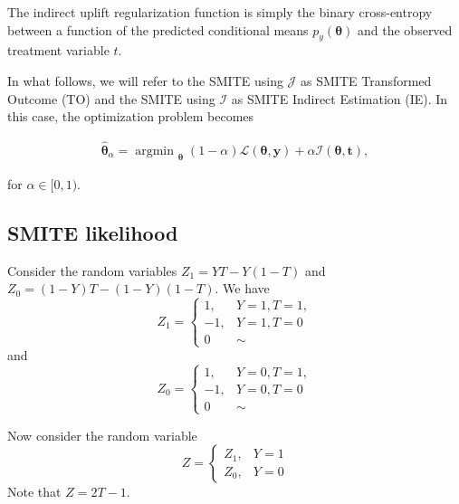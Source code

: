 \documentclass{article}
\def\tt{\mathbf t}
\def\y{\mathbf y}
\DeclareMathOperator*{\argmin}{argmin~} %
\begin{document}
The indirect uplift regularization function is simply the binary cross-entropy between a function of the predicted conditional means $p_y(\boldsymbol{\theta})$ and the observed treatment variable $t$. 


In what follows, we will refer to the SMITE using $\mathcal{J}$ as SMITE Transformed Outcome (TO) and the SMITE using  $\mathcal{I}$ as SMITE Indirect Estimation (IE). In this case, the optimization problem becomes

\begin{align*}
    {\boldsymbol{\hat\theta}}_{\alpha} = \argmin_{\boldsymbol{\theta}} (1 - \alpha)  \mathcal{L}(\boldsymbol{\theta}, \y) + \alpha \mathcal{I}(\boldsymbol{\theta}, \tt),
\end{align*}

for $\alpha \in [0,1)$.

%

\subsection{SMITE likelihood}

Consider the random variables $Z_1 = YT - Y(1-T)$ and $Z_0 = (1-Y)T - (1-Y)(1-T)$.
We have
\[ Z_1 = \left\{ \begin{array}{cc} 1, &  Y=1, T=1, \\ -1, & Y=1, T=0\\ 0 & \sim \end{array} \right.
\]
and
\[ Z_0 = \left\{ \begin{array}{cc} 1, &  Y=0, T=1, \\ -1, & Y=0, T=0\\ 0 & \sim \end{array} \right.
\]

Now consider the random variable
\[ Z = \left\{ \begin{array}{cc} Z_1, &  Y=1 \\ Z_0, & Y=0 \end{array} \right.
\]
Note that $Z= 2T -1 $.
\end{document}

